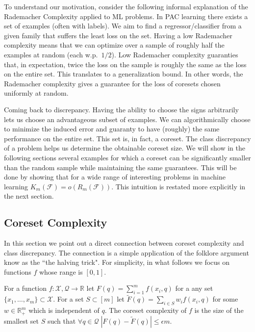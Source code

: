 \documentclass[anon,12pt]{colt2019} %
\newcommand{\R}{\mathbb{R}}
\newcommand{\eps}{\epsilon}
\newcommand{\F}{\mathcal{F}}
\newcommand{\X}{\mathcal{X}}
\newcommand{\Q}{\mathcal{Q}}
\begin{document}
To understand our motivation, consider the following informal explanation of the Rademacher Complexity applied to ML problems. 
In PAC learning there exists a set of examples (often with labels).
We aim to find a regressor/classifier from a given family that suffers the least loss on the set. 
Having a low Rademacher complexity means that we can optimize over a sample of roughly half the examples at random (each w.p.\ $1/2$).
Low Rademacher complexity guaranties that, in expectation, twice the loss on the sample is roughly the same as the loss on the entire set.
This translates to a generalization bound. 
In other words, the Rademacher complexity gives a guarantee for the loss of coresets chosen uniformly at random.

Coming back to discrepancy. Having the ability to choose the signs arbitrarily lets us choose an advantageous subset of examples.
We can algorithmically choose to minimize the induced error and guaranty to have (roughly) the same performance on the entire set. 
This set is, in fact, a coreset. The class discrepancy of a problem helps us determine the obtainable coreset size. 
We will show in the following sections several examples for which a coreset can be significantly smaller than the random sample while maintaining the same guarantees. This will be done by showing that for a wide range of interesting problems in machine learning $K_m(\F) = o(R_m(\F))$.
This intuition is restated more explicitly in the next section.

\subsection{Coreset Complexity}
In this section we point out a direct connection between coreset complexity and class discrepancy.
The connection is a simple application of the folklore argument know as the ``the halving trick".
For simplicity, in what follows we focus on functions $f$ whose range is $[0,1]$.

\begin{definition}  
For a function $f:\X,\Q\rightarrow \R$ let $F(q) = \sum_{i=1}^{m} f(x_i,q)$ for a any set $\{x_1,\ldots,x_m\} \subset \X$.
For a set $S \subset [m]$ let $\tilde F(q) = \sum_{i \in S}w_i f(x_i,q)$ for some $w\in\R_+^m$ which is independent of $q$.
The coreset complexity of $f$ is the size of the smallest set $S$ such that $\forall q \in \Q \; |F(q)  - \tilde F(q)| \le \eps m$.
\end{definition}
\end{document}
